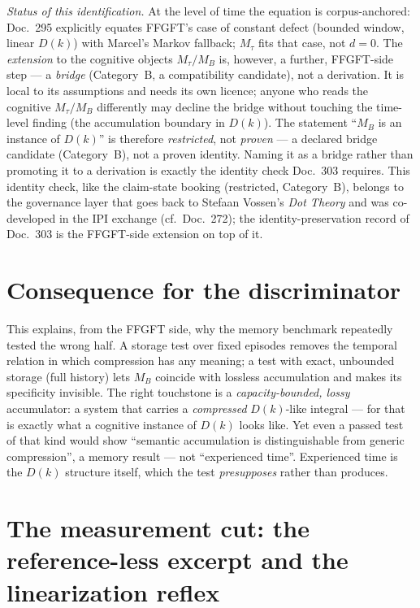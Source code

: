\emph{Status of this identification.} At the level of time the equation is corpus-anchored:
Doc.~295 explicitly equates FFGFT's case of constant defect (bounded window, linear
$D(k)$) with Marcel's Markov fallback; $M_\tau$ fits that case, not $d = 0$. The
\emph{extension} to the cognitive objects $M_\tau/M_B$ is, however, a further, FFGFT-side
step --- a \emph{bridge} (Category~B, a compatibility candidate), not a derivation. It is
local to its assumptions and needs its own licence; anyone who reads the cognitive
$M_\tau/M_B$ differently may decline the bridge without touching the time-level finding (the
accumulation boundary in $D(k)$). The statement \enquote{$M_B$ is an instance of $D(k)$} is
therefore \emph{restricted}, not \emph{proven} --- a declared bridge candidate (Category~B), not a proven identity.
Naming it as a bridge rather than promoting it to a derivation is exactly the identity check
Doc.~303 requires. This identity check, like the claim-state booking (restricted, Category~B),
belongs to the governance layer that goes back to Stefaan Vossen's \emph{Dot Theory} and was
co-developed in the IPI exchange (cf.\ Doc.~272); the identity-preservation record of Doc.~303
is the FFGFT-side extension on top of it.

\section{Consequence for the discriminator}

This explains, from the FFGFT side, why the memory benchmark repeatedly tested the wrong
half. A storage test over fixed episodes removes the temporal relation in which compression
has any meaning; a test with exact, unbounded storage (full history) lets $M_B$ coincide
with lossless accumulation and makes its specificity invisible. The right touchstone is a
\emph{capacity-bounded, lossy} accumulator: a system that carries a \emph{compressed}
$D(k)$-like integral --- for that is exactly what a cognitive instance of $D(k)$ looks like.
Yet even a passed test of that kind would show \enquote{semantic accumulation is
distinguishable from generic compression}, a memory result --- not \enquote{experienced
time}. Experienced time is the $D(k)$ structure itself, which the test \emph{presupposes}
rather than produces.

\section{The measurement cut: the reference-less excerpt and the linearization reflex}

